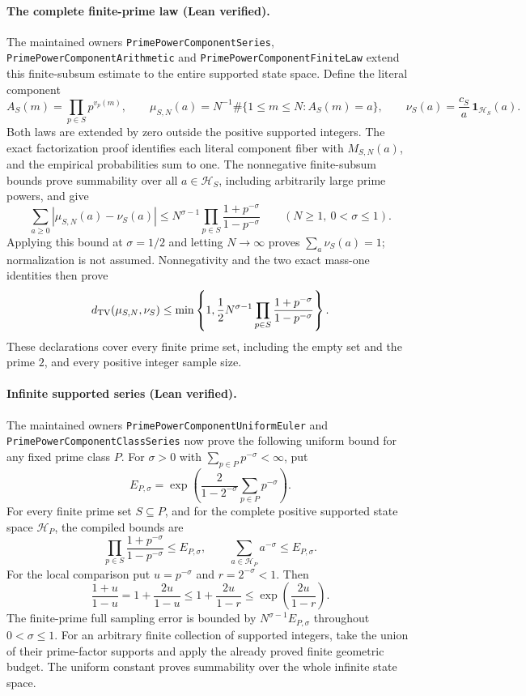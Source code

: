 \documentclass[11pt]{article}
\theoremstyle{definition}
\begin{document}
\paragraph{The complete finite-prime law (Lean verified).}
The maintained owners \texttt{PrimePowerComponentSeries},
\texttt{PrimePowerComponentArithmetic} and
\texttt{PrimePowerComponentFiniteLaw} extend this finite-subsum estimate
to the entire supported state space. Define the literal component
\[
 A_S(m)=\prod_{p\in S}p^{v_p(m)},\qquad
 \mu_{S,N}(a)=N^{-1}\#\{1\le m\le N:A_S(m)=a\},\qquad
 \nu_S(a)=\frac{c_S}{a}\,\mathbf1_{\mathcal H_S}(a).
\]
Both laws are extended by zero outside the positive supported integers.
The exact factorization proof identifies each literal component fiber
with \(M_{S,N}(a)\), and the empirical probabilities sum to one.
The nonnegative finite-subsum bounds prove summability over all
\(a\in\mathcal H_S\), including arbitrarily large prime powers, and give
\[
 \sum_{a\ge0}|\mu_{S,N}(a)-\nu_S(a)|
 \le N^{\sigma-1}
       \prod_{p\in S}\frac{1+p^{-\sigma}}{1-p^{-\sigma}}
       \qquad(N\ge1,\ 0<\sigma\le1).
\]
Applying this bound at \(\sigma=1/2\) and letting \(N\to\infty\)
proves \(\sum_a\nu_S(a)=1\); normalization is not assumed.
Nonnegativity and the two exact mass-one identities then prove
\[
 d_{\rm TV}(\mu_{S,N},\nu_S)
 \le\min\left\{1,\frac12 N^{\sigma-1}
       \prod_{p\in S}\frac{1+p^{-\sigma}}{1-p^{-\sigma}}\right\}.
\]
These declarations cover every finite prime set, including the empty
set and the prime \(2\), and every positive integer sample size.
\paragraph{Infinite supported series (Lean verified).}
The maintained owners \texttt{PrimePowerComponentUniformEuler} and
\texttt{PrimePowerComponentClassSeries} now prove the following uniform
bound for any fixed prime class \(P\). For \(\sigma>0\) with
\(\sum_{p\in P}p^{-\sigma}<\infty\), put
\[
 E_{P,\sigma}=\exp\left(
      \frac{2}{1-2^{-\sigma}}\sum_{p\in P}p^{-\sigma}\right).
\]
For every finite prime set \(S\subseteq P\), and for the complete
positive supported state space \(\mathcal H_P\), the compiled bounds are
\[
 \prod_{p\in S}\frac{1+p^{-\sigma}}{1-p^{-\sigma}}
       \le E_{P,\sigma},\qquad
 \sum_{a\in\mathcal H_P}a^{-\sigma}\le E_{P,\sigma}.
\]
For the local comparison put \(u=p^{-\sigma}\) and
\(r=2^{-\sigma}<1\). Then
\[
 \frac{1+u}{1-u}
 =1+\frac{2u}{1-u}
 \le1+\frac{2u}{1-r}
 \le\exp\left(\frac{2u}{1-r}\right).
\]
The finite-prime full sampling error is bounded by
\(N^{\sigma-1}E_{P,\sigma}\) throughout \(0<\sigma\le1\).
For an arbitrary finite collection of supported integers, take the
union of their prime-factor supports and apply the already proved
finite geometric budget. The uniform constant proves summability
over the whole infinite state space.
\end{document}
